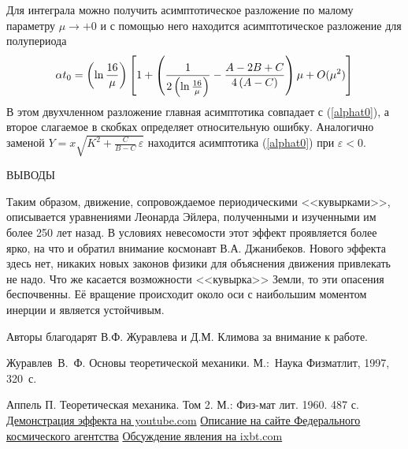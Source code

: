 \documentclass[14pt,a4paper]{extarticle}
\def\eps{\varepsilon}
\begin{document}
Для интеграла можно получить асимптотическое разложение по малому параметру $\mu\rightarrow +0$
и с помощью него находится асимптотическое разложение для полупериода 
$$\alpha t_{0}=
\left( \ln \frac{16}{\mu }\right) \left[ 1+\left( \frac{1}{2\left( \ln \frac{%
16}{\mu }\right) }-\frac{A-2B+C}{4\left( A-C\right) }\right) \mu +O(\mu ^{2})%
\right] $$
В этом двухчленном разложение главная асимптотика совпадает с (\ref{alphat0}), а второе слагаемое в скобках определяет относительную ошибку.
Аналогично заменой $Y=x\sqrt{K^2+\frac{C}{B-C}\,\varepsilon}$ находится асимптотика (\ref{alphat0}) при $\eps<0$. 

{ВЫВОДЫ} 


\smallskip
Таким образом, движение, сопровождаемое периодическими <<кувырками>>, описывается уравнениями Леонарда Эйлера, полученными и изученными им более 250 лет назад. В условиях невесомости этот эффект проявляется более ярко, на что и обратил внимание космонавт В.А. Джанибеков. Нового эффекта здесь нет, никаких новых законов физики для объяснения движения привлекать не надо. Что же касается возможности <<кувырка>> Земли, то эти опасения беспочвенны. Её вращение происходит около оси с наибольшим моментом инерции и является устойчивым.    


\smallskip

Авторы благодарят В.Ф. Журавлева и Д.М. Климова за внимание к работе.

\begin{thebibliography}{99}
 Журавлев~В.~Ф. Основы теоретической механики.
М.:~Наука Физматлит, 1997, 320~с.

 Аппель П. Теоретическая механика. Том 2. М.: Физ-мат лит. 1960. 487 с.
 \href{http://youtu.be/60iBwQwAnqo?t=1m30s}{Демонстрация эффекта на youtube.com}
 \href{http://www.federalspace.ru/main.php?id=2&nid=19068}{Описание на сайте Федерального космического агентства}
 \href{http://forum.ixbt.com/topic.cgi?id=64:1310}{Обсуждение явления на ixbt.com}
\end{thebibliography}
\end{document}

